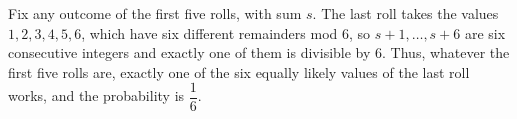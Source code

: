 Fix any outcome of the first five rolls, with sum $s$. The last roll takes the values $1,2,3,4,5,6$, which have six different remainders mod $6$, so $s+1,\dots,s+6$ are six consecutive integers and exactly one of them is divisible by $6$. Thus, whatever the first five rolls are, exactly one of the six equally likely values of the last roll works, and the probability is $\boxed{\dfrac{1}{6}}$.
